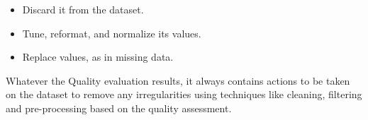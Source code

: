 \begin{itemize}
	\item{
		Discard it from the dataset.
	}
	\item {
		Tune, reformat, and normalize its values.
	}
	\item {
		Replace values, as in missing data.
	}
\end{itemize}

Whatever the Quality evaluation results, it always contains
actions to be taken on the dataset to remove any
irregularities using techniques like cleaning, filtering and
pre-processing based on the quality assessment.